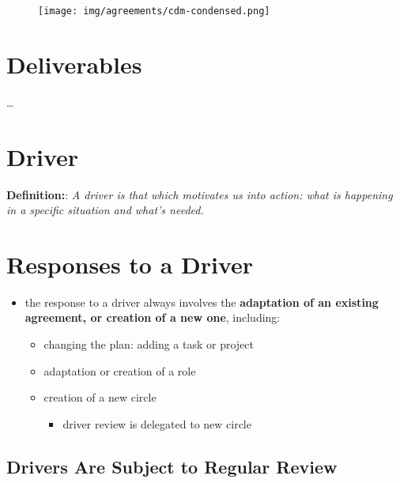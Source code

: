 \begin{figure}[htbp]
\centering
\texttt{[image: img/agreements/cdm-condensed.png]}
\end{figure}

\section{Deliverables}
\label{deliverables}

{\ldots}

\section{Driver}
\label{driver}

\textbf{Definition:}: \emph{A driver is that which motivates us into action: what is happening in a specific situation and what’s needed.}

\section{Responses to a Driver}
\label{responsestoadriver}

\begin{itemize}
\item the response to a driver always involves the \textbf{adaptation of an existing agreement, or creation of a new one}, including:

\begin{itemize}
\item changing the plan: adding a task or project

\item adaptation or creation of a role

\item creation of a new circle

\begin{itemize}
\item driver review is delegated to new circle

\end{itemize}

\end{itemize}

\end{itemize}

\subsection{Drivers Are Subject to Regular Review}
\label{driversaresubjecttoregularreview}

